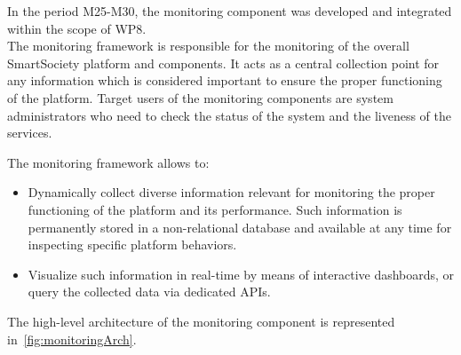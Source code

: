 In the period M25-M30, the monitoring component was developed and integrated within the scope of WP8.\\
The monitoring framework is responsible for the monitoring of the overall SmartSociety platform and components. It acts as a central collection point for any information which is considered important to ensure the proper functioning of the platform. Target users of the monitoring components are system administrators who need to check the status of the system and the liveness of the services. 

The monitoring framework allows to:
\begin{itemize}
\item Dynamically collect diverse information relevant for monitoring the proper functioning of the platform and its performance. Such information is permanently stored in a non-relational database and available at any time for inspecting specific platform behaviors.
\item Visualize such information in real-time by means of interactive dashboards, or query the collected data via dedicated APIs. %
\end{itemize} 


The high-level architecture of the monitoring component is represented in~\ref{fig:monitoringArch}.


